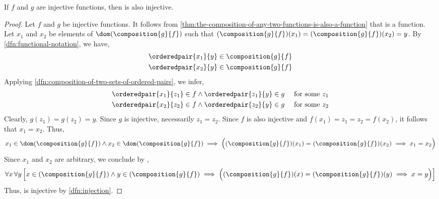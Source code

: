 \begin{thm}
    \label{thm:the-composition-of-injective-functions-is-injective}
    If \( f \) and \( g \) are injective functions, then  is also injective.
\end{thm}

\begin{proof}
    Let \( f \) and \( g \) be injective functions. It follows from \cref{thm:the-composition-of-any-two-functions-is-also-a-function} that
     is a function. Let \( x_{1} \) and \( x_{2} \) be elements of \( \dom \mleft( \composition{g}{f} \mright) \) such that
    \( \mleft( \composition{g}{f} \mright)(x_{1}) = \mleft( \composition{g}{f} \mright)(x_{2}) = y \). By \cref{dfn:functional-notation},
    we have,
    \begin{gather*}
        \orderedpair{x_{1}}{y} \in \composition{g}{f} \\
        \orderedpair{x_{2}}{y} \in \composition{g}{f}
    \end{gather*}
    Applying \cref{dfn:composition-of-two-sets-of-ordered-pairs}, we infer,
    \begin{equation*}
        \begin{aligned}
            \orderedpair{x_{1}}{z_{1}} \in f \land \orderedpair{z_{1}}{y} \in g&\\
            \orderedpair{x_{2}}{z_{2}} \in f \land \orderedpair{z_{2}}{y} \in g&
        \end{aligned}
        \text{  }
        \begin{aligned}
            &\quad\text{for some \( z_{1} \)}\\
            &\quad\text{for some \( z_{2} \)}
        \end{aligned}
    \end{equation*}
    Clearly, \( g(z_{1}) = g(z_{2}) = y \). Since \( g \) is injective, necessarily \( z_{1} = z_{2} \). Since \( f \) is also injective
    and \( f(x_{1}) = z_{1} = z_{2} = f(x_{2}) \), it follows that \( x_{1} = x_{2} \). Thus,
    \begin{equation*}
        x_{1} \in \dom \mleft( \composition{g}{f} \mright)
        \land
        x_{2} \in \dom \mleft( \composition{g}{f} \mright)
        \implies
        \Big( \mleft( \composition{g}{f} \mright)(x_{1}) = \mleft( \composition{g}{f} \mright)(x_{2}) \implies x_{1} = x_{2} \Big)
    \end{equation*}
    Since \( x_{1} \) and \( x_{2} \) are arbitrary, we conclude by ,
    \begin{equation*}
        \forall x \, \forall y \, \Big[ x \in \mleft( \composition{g}{f} \mright) \land y \in \mleft( \composition{g}{f} \mright)
        \implies
        \Big( \mleft( \composition{g}{f} \mright)(x) = \mleft( \composition{g}{f} \mright)(y) \implies x = y \Big) \Big]
    \end{equation*}
    Thus,  is injective by \cref{dfn:injection}.
\end{proof}

